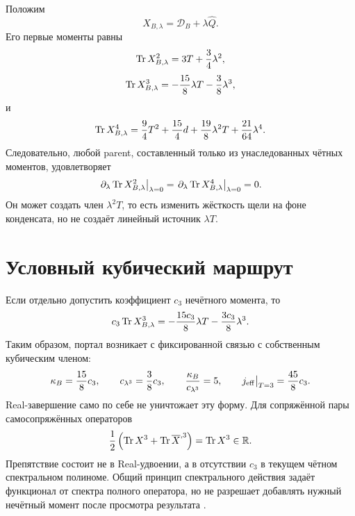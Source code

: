 Положим
\begin{equation}
 X_{B,\lambda}=\mathcal D_B+\lambda\widehat Q.
 \label{eq:v8-coherence-portal-total-operator}
\end{equation}
Его первые моменты равны
\begin{equation}
 \operatorname{Tr} X_{B,\lambda}^2=3T+\frac34\lambda^2,
 \label{eq:v8-coherence-portal-second-moment}
\end{equation}
\begin{equation}
 \operatorname{Tr} X_{B,\lambda}^3
 =-\frac{15}{8}\lambda T-\frac38\lambda^3,
 \label{eq:v8-coherence-portal-cubic-moment}
\end{equation}
и
\begin{equation}
 \operatorname{Tr} X_{B,\lambda}^4
 =\frac94T^2+\frac{15}{4}d
 +\frac{19}{8}\lambda^2T+\frac{21}{64}\lambda^4.
 \label{eq:v8-coherence-portal-fourth-moment}
\end{equation}
Следовательно, любой parent, составленный только из унаследованных чётных
моментов, удовлетворяет
\begin{equation}
 \left.\partial_\lambda\operatorname{Tr} X_{B,\lambda}^{2}\right|_{\lambda=0}
 =
 \left.\partial_\lambda\operatorname{Tr} X_{B,\lambda}^{4}\right|_{\lambda=0}=0.
 \label{eq:v8-coherence-portal-even-moment-no-source}
\end{equation}
Он может создать член $\lambda^2T$, то есть изменить жёсткость щели на
фоне конденсата, но не создаёт линейный источник $\lambda T$.

\section{Условный кубический маршрут}

Если отдельно допустить коэффициент $c_3$ нечётного момента, то
\begin{equation}
 c_3\operatorname{Tr} X_{B,\lambda}^3
 =-\frac{15c_3}{8}\lambda T-\frac{3c_3}{8}\lambda^3.
 \label{eq:v8-coherence-portal-cubic-parent-decomposition}
\end{equation}
Таким образом, портал возникает с фиксированной связью с собственным
кубическим членом:
\begin{equation}
 \kappa_B=\frac{15}{8}c_3,
 \qquad
 c_{\lambda^3}=\frac38c_3,
 \qquad
 \frac{\kappa_B}{c_{\lambda^3}}=5,
 \qquad
 j_{\rm eff}\big|_{T=3}=\frac{45}{8}c_3.
 \label{eq:v8-coherence-portal-fixed-cubic-ratio}
\end{equation}
Real-завершение само по себе не уничтожает эту форму. Для сопряжённой пары
самосопряжённых операторов
\begin{equation}
 \frac12\left(\operatorname{Tr} X^3+\operatorname{Tr}\overline X^{,3}\right)=\operatorname{Tr} X^3\in\mathbb R.
 \label{eq:v8-coherence-portal-real-half-trace}
\end{equation}
Препятствие состоит не в Real-удвоении, а в отсутствии $c_3$ в текущем
чётном спектральном полиноме. Общий принцип спектрального действия задаёт
функционал от спектра полного оператора, но не разрешает добавлять нужный
нечётный момент после просмотра результата
\cite{v8-coherence-portal-spectral-action}.

